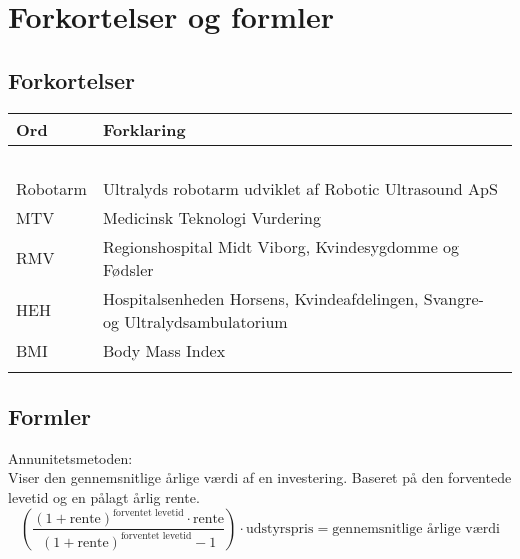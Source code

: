 \chapter{Forkortelser og formler}

\section{Forkortelser}
\begin{longtabu} to 
    Ord &    Forklaring\\
    \toprule\ \\
    Robotarm & Ultralyds robotarm udviklet af Robotic Ultrasound ApS \\
    MTV & Medicinsk Teknologi Vurdering \\
  	RMV & Regionshospital Midt Viborg, Kvindesygdomme og Fødsler \\
  	HEH & Hospitalsenheden Horsens, Kvindeafdelingen, Svangre- og Ultralydsambulatorium \\
  	BMI & Body Mass Index \\
   
\label{forkort}
\end{longtabu}

\section{Formler}\label{Formler}
Annunitetsmetoden: \\
Viser den gennemsnitlige årlige værdi af en investering. Baseret på den forventede levetid og en pålagt årlig rente.
\begin{equation}
\left( \dfrac{(1+\text{rente})^{\text{forventet levetid}}\cdot \text{rente}}{(1+\text{rente})^{\text{forventet levetid}}-1}\right)\cdot \text{udstyrspris} = \text{gennemsnitlige årlige værdi}
\end{equation}